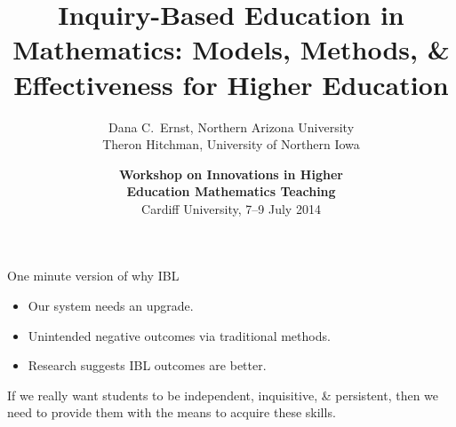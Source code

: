 \documentclass[10pt,handout]{beamer}
\begin{document}

\title[Inquiry-Based Education in Mathematics]
{\large \textbf{Inquiry-Based Education in Mathematics: Models, Methods, \& Effectiveness for Higher Education}}
\author[D.C.~Ernst and TJ Hitchman]{Dana C.~Ernst, Northern Arizona University\\
Theron Hitchman, University of Northern Iowa}

\vspace{1em}

\date{\textbf{Workshop on Innovations in Higher\\ Education Mathematics Teaching}\\
Cardiff University, 7--9 July 2014}

\frame{\titlepage}


\begin{frame}

\vfill
\begin{center}
\end{center}
\vfill

\end{frame}


\begin{frame}

\begin{block}{One minute version of why IBL}
\begin{itemize}
\item Our system needs an upgrade.
\item Unintended negative outcomes via traditional methods.
\item Research suggests IBL outcomes are better.
\end{itemize}
\end{block}

\vspace{1em}


\vspace{1em}

If we really want students to be independent, inquisitive, & persistent, then we need to provide them with the means to acquire these skills.

\end{frame}
\end{document}
